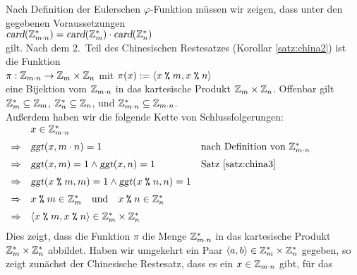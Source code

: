 \proof
Nach Definition der Eulerschen $\varphi$-Funktion müssen wir zeigen, dass unter den gegebenen
Voraussetzungen 
\\[0.2cm]
\hspace*{1.3cm}
$\textsl{card}(\mathbb{Z}_{m \cdot n}^*) = \textsl{card}(\mathbb{Z}_{m}^*) \cdot \textsl{card}(\mathbb{Z}_{n}^*)$
\\[0.2cm]
gilt.  Nach dem 2.~Teil des Chinesischen Restesatzes (Korollar \ref{satz:china2}) ist die Funktion
\\[0.2cm]
\hspace*{1.3cm}
$\pi : \mathbb{Z}_{m \cdot n} \rightarrow \mathbb{Z}_{m} \times \mathbb{Z}_{n}$ \quad mit
$\pi(x) := \langle x \;\texttt{\%}\; m, x \;\texttt{\%}\; n \rangle$
\\[0.2cm]
eine Bijektion vom $\mathbb{Z}_{m \cdot n}$ in das kartesische Produkt $\mathbb{Z}_{m} \times \mathbb{Z}_{n}$.  Offenbar gilt
\\[0.2cm]
\hspace*{1.3cm}
$\mathbb{Z}_{m}^* \subseteq \mathbb{Z}_{m}$, \quad
$\mathbb{Z}_{n}^* \subseteq \mathbb{Z}_{n}$, \quad und \quad
$\mathbb{Z}_{m \cdot n}^* \subseteq \mathbb{Z}_{m \cdot n}$.
\\[0.2cm]
Außerdem haben wir die folgende Kette von Schlussfolgerungen:
\\[0.2cm]
\hspace*{1.3cm}
$
\begin{array}[t]{lll}
            & x \in \mathbb{Z}_{m \cdot n}^*  \\[0.2cm]
\Rightarrow & \textsl{ggt}(x, m \cdot n) = 1 
            & \mbox{nach Definition von $\mathbb{Z}_{m \cdot n}^*$}                              \\[0.2cm]
\Rightarrow & \textsl{ggt}(x, m) = 1 \wedge \textsl{ggt}(x, n) = 1 
            & \mbox{Satz \ref{satz:china3}}                                             \\[0.2cm]
\Rightarrow & \textsl{ggt}(x \;\texttt{\%}\; m, m) = 1 \wedge \textsl{ggt}(x \;\texttt{\%}\; n, n) = 1 
              \\[0.2cm]
\Rightarrow & x \;\texttt{\%}\; m \in \mathbb{Z}_{m}^* \quad \mbox{und} \quad x \;\texttt{\%}\; n \in \mathbb{Z}_{n}^*  \\[0.2cm]
\Rightarrow & \langle x \;\texttt{\%}\; m, x \;\texttt{\%}\; n \rangle \in \mathbb{Z}_{m}^* \times \mathbb{Z}_{n}^*  \\[0.2cm]
\end{array}
$
\\[0.2cm]
Dies zeigt, dass die Funktion $\pi$ die Menge $\mathbb{Z}_{m \cdot n}^*$ in das kartesische Produkt
$\mathbb{Z}_{m}^* \times \mathbb{Z}_{n}^*$ abbildet.  Haben wir umgekehrt ein Paar $\langle a, b \rangle \in \mathbb{Z}_{m}^* \times \mathbb{Z}_{n}^*$ gegeben, 
so zeigt zunächst der Chinesische Restesatz, dass es ein $x \in \mathbb{Z}_{m \cdot n}$ gibt, für das 
